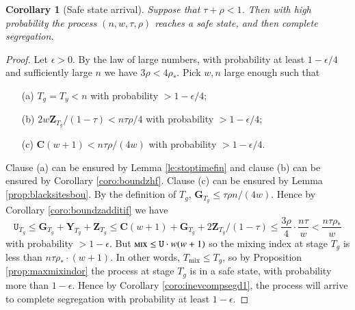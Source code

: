 \documentclass[11pt]{article}
\theoremstyle{plain}
\newtheorem{coro}[thm]{Corollary}
\numberwithin{equation}{subsection}
\newcommand{\ZZ}{\mathbf{Z}}
\newcommand{\GG}{\mathbf{G}}
\newcommand{\YY}{\mathbf{Y}}
\newcommand{\CC}{\mathbf{C}}
\newcommand{\mix}{\textsc{mix}}
\begin{document}
\begin{coro} [Safe state arrival]
Suppose that $\tau+\rho<1$. Then with high probability
the process $(n,w,\tau,\rho)$  reaches a safe state, and then complete segregation.
\end{coro}
\begin{proof}
Let $\epsilon>0$. By the law of large numbers,
with probability at least $1-\epsilon/4$ and sufficiently large $n$ 
we have $3\rho<4\rho_{\ast}$. 
Pick $w,n$ large enough such that
\begin{itemize}
\item[(a)] $T_g=T_y<n$ with probability $>1-\epsilon/4$;
\item[(b)] $2w\ZZ_{T_g}/(1-\tau)<n\tau\rho/4$ with probability $>1-\epsilon/4$;
\item[(c)]  $\CC(w+1)<n\tau\rho/(4w)$ with probability $>1-\epsilon/4$.
\end{itemize}
Clause (a) can be ensured by 
Lemma \ref{le:stoptimefin} and clause (b)
can be ensured by
Corollary \ref{coro:boundzhf}.
Clause (c) can be ensured by
Lemma 
\ref{prop:blacksitesbou}.
By the definition of $T_g$,
$\GG_{T_g}\leq \tau\rho n/(4w)$.
Hence by
Corollary \ref{coro:boundzadditif}
we have
\[
\mathtt{U}_{T_g}\leq 
\GG_{T_g} + \YY_{T_g} + \ZZ_{T_g}\leq
\CC(w+1) + \GG_{T_g} + 2\ZZ_{T_g} /(1-\tau)\leq
\frac{3\rho}{4}\cdot\frac{n\tau}{w}<
\frac{n\tau\rho_{\ast}}{w}
\]
with probability $>1-\epsilon$.
But  $\mix\leq \mathtt{U}\cdot w(w+1)$
so the mixing index at stage $T_g$ is less than
$n\tau\rho_{\ast}\cdot(w+1)$. In other words, $T_{\textrm{mix}}\leq T_g$, so
by Proposition \ref{prop:maxmixindor} the process at stage $T_g$ is
in a safe state, with probability more than $1-\epsilon$.
Hence by Corollary \ref{coro:inevcompsegd1}, the process will arrive
to complete segregation 
with probability at least $1-\epsilon$.
\end{proof}
\end{document}
